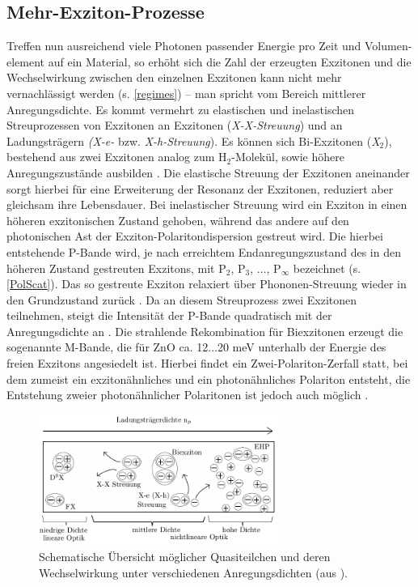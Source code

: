 \subsection{Mehr-Exziton-Prozesse} Treffen nun ausreichend viele Photonen
passender Energie pro Zeit und Volumen- element auf ein Material, so erhöht sich
die Zahl der erzeugten Exzitonen und die Wechselwirkung zwischen den einzelnen
Exzitonen kann nicht mehr vernachlässigt \mbox{werden} (s. \autoref{regimes}) –
man spricht vom Bereich mittlerer Anregungsdichte. Es kommt \mbox{vermehrt} zu
elastischen und inelastischen Streuprozessen von Exzitonen an \mbox{Exzitonen}
(\textit{X-X-Streuung}) und an Ladungsträgern \textit{(X-e-} bzw.
\textit{X-h-Streuung}). Es können sich Bi-Exzitonen (\textit{X$_\text{2}$}),
bestehend aus zwei Exzitonen analog zum H$_\text{2}$-Molekül, sowie höhere
Anregungszustände ausbilden \cite{Corfdir.2011}. Die elastische Streuung der
Exzitonen aneinander sorgt hierbei für eine Erweiterung der Resonanz der
Exzitonen, reduziert aber \mbox{gleichsam} ihre Lebensdauer. Bei inelastischer
Streuung wird ein Exziton in einen \mbox{höheren} exzitonischen Zustand gehoben,
während das andere auf den photonischen Ast der Exziton-Polaritondispersion
gestreut wird. Die hierbei entstehende P-Bande wird, je nach erreichtem
Endanregungszustand des in den höheren Zustand gestreuten Exzitons, mit
P$_\text{2}$, P$_\text{3}$, $\ldots$, P$_\infty$ bezeichnet (s.
\autoref{PolScat}). Das so gestreute Exziton relaxiert über Phononen-Streuung
wieder in den Grundzustand zurück \cite{Klingshirn.1975}. Da an diesem
Streuprozess zwei Exzitonen teilnehmen, steigt die Intensität der P-Bande
quadratisch mit der Anregungsdichte an \cite{Priller.2004}. Die strahlende
Rekombination für Biexzitonen erzeugt die sogenannte M-Bande, die für ZnO ca.
12$\ldots$20 meV unterhalb der Energie des freien Exzitons angesiedelt ist.
Hierbei findet ein Zwei-Polariton-Zerfall statt, bei dem zumeist ein
exzitonähnliches und ein photonähnliches Polariton entsteht, die Entstehung
zweier photonähnlicher Polaritonen ist jedoch auch möglich \cite{Hvam.1983}.
\begin{figure}[htb] \centering
\includegraphics[width=0.7\textwidth]{Bilder/Vorbetrachtung/regimes}
\caption[Übersicht Exzitonen unter hohen Anregungsdichten]{Schematische
Übersicht möglicher Quasiteilchen und deren Wechselwirkung unter verschiedenen
Anregungsdichten (aus \cite{Richters.Diss}).} \label{regimes} \end{figure}
